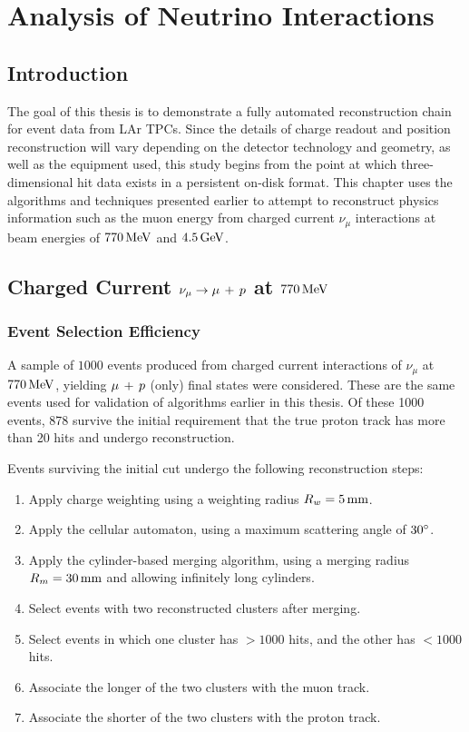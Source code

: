 \chapter{Analysis of Neutrino Interactions}\label{chapter:Analysis}
\section{Introduction}
The goal of this thesis is to demonstrate a fully automated reconstruction chain for event data from \ac{LAr TPC}s. Since the details of charge readout and position reconstruction will vary depending on the detector technology and geometry, as well as the equipment used, this study begins from the point at which three-dimensional hit data exists in a persistent on-disk format. This chapter uses the algorithms and techniques presented earlier to attempt to reconstruct physics information such as the muon energy from charged current $\nu_\mu$ interactions at beam energies of $770\,\mathrm{MeV}$ and $4.5\,\mathrm{GeV}$.

\section{Charged Current $\nu_\mu \rightarrow \mu\,+\,p$ at $770\,\mathrm{MeV}$}
\subsection{Event Selection Efficiency}
A sample of $1000$ events produced from charged current interactions of $\nu_\mu$ at $770\,\mathrm{MeV}$, yielding $\mu\,+\,p$ (only) final states were considered. These are the same events used for validation of algorithms earlier in this thesis. Of these 1000 events, 878 survive the initial requirement that the true proton track has more than 20 hits and undergo reconstruction. 

Events surviving the initial cut undergo the following reconstruction steps:
\begin{enumerate}
    \item Apply charge weighting using a weighting radius $R_w=5\,\mathrm{mm}$.
    \item Apply the cellular automaton, using a maximum scattering angle of $30^\circ$.
    \item Apply the cylinder-based merging algorithm, using a merging radius $R_m=30\,\mathrm{mm}$ and allowing infinitely long cylinders.
    \item Select events with two reconstructed clusters after merging.
    \item Select events in which one cluster has $> 1000$ hits, and the other has $< 1000$ hits.
    \item Associate the longer of the two clusters with the muon track.
    \item Associate the shorter of the two clusters with the proton track.
\end{enumerate}

